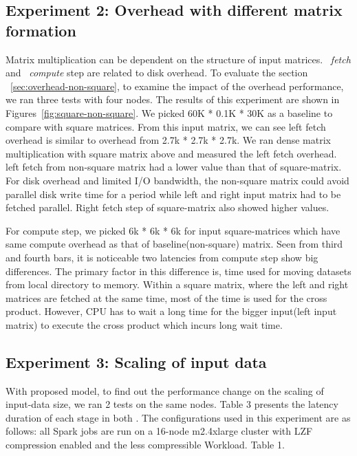 \documentclass[10pt, conference, compsocconf]{IEEEtran}
\begin{document}
\subsection{Experiment 2: Overhead with different matrix formation}

Matrix multiplication can be dependent on the structure of input matrices. ~\textit{fetch} and ~\textit{compute} step are related to disk overhead. To evaluate the section ~\ref{sec:overhead-non-square}, to examine the impact of the overhead performance, we ran three tests with four nodes. The results of this experiment are shown in Figures~\ref{fig:square-non-square}. We picked 60K * 0.1K * 30K as a baseline to compare with square matrices. From this input matrix, we can see left fetch overhead is similar to overhead from 2.7k * 2.7k * 2.7k. We ran dense matrix multiplication with square matrix above and measured the left fetch overhead. left fetch from non-square matrix had a lower value than that of square-matrix. For disk overhead and limited I/O bandwidth, the non-square matrix could avoid parallel disk write time for a period while left and right input matrix had to be fetched parallel. Right fetch step of square-matrix also showed higher values. 

For compute step, we picked 6k * 6k * 6k for input square-matrices which have same compute overhead as that of baseline(non-square) matrix. Seen from third and fourth bars, it is noticeable two latencies from compute step show big differences. The primary factor in this difference is, time used for moving datasets from local directory to memory. Within a square matrix, where the left and right matrices are fetched at the same time, most of the time is used for the cross product. However, CPU has to wait a long time for the bigger input(left input matrix) to execute the cross product which incurs long wait time. 


\subsection{Experiment 3: Scaling of input data}

With proposed model, to find out the performance change on the scaling of input-data size, we ran 2 tests on the same nodes. 
Table 3 presents the latency duration of each stage in both . The
configurations used in this experiment are as follows: all
Spark jobs are run on a 16-node m2.4xlarge cluster with
LZF compression enabled and the less compressible Workload. Table 
1.
\end{document}
